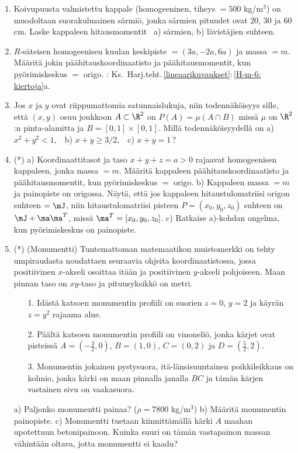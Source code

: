 \begin{enumerate}
\item 
Koivupuusta valmistettu kappale (homogeeninen, tiheys $=500$ kg/m$^3$) on muodoltaan 
suorakulmainen särmiö, jonka särmien pituudet ovat $20$, $30$ ja $60$ cm. Laske kappaleen 
hitausmomentit \ a) särmien, b) lävistäjien suhteen.

\item
$R$-säteisen homogeenisen kuulan keskipiste $=(3a,-2a,6a)$ ja massa $=m$. Määritä jokin
päähitauskoordinaatisto ja päähitausmomentit, kun pyörimiskeskus $=$ origo. : Ks.\
Harj.teht.\,\ref{lineaarikuvaukset}:\,\ref{H-m-6: kiertoja}a.

\item 
Jos $x$ ja $y$ ovat riippumattomia satunnaislukuja, niin todennäköisyys sille, että $(x,y)$ osuu
joukkoon $A\subset\R^2$ on $P(A)=\mu(A \cap B)$ missä $\mu$ on $\R^2$:n pinta-alamitta ja
$B=[0,1]\times[0,1]$. Millä todennäköisyydellä on \newline
a) $x^2+y^2 < 1$, \,\ b) $x+y\ge 3/2$, \,\ c) $x+y=1$\,?

\item (*)
a) Koordinaattitasot ja taso $x+y+z=a>0$ rajaavat homogeenisen kappaleen, jonka massa $=m$.
Määritä kappaleen päähitauskoordinaatisto ja päähitausmomentit, kun pyörimiskeskus
$=$ origo. \vspace{1mm}\newline
b) Kappaleen massa $=m$ ja painopiste on origossa. Näytä, että jos kappaleen hitaustulomatriisi
origon suhteen $=\mJ$, niin hitaustulomatriisi pisteen $P=(x_0,y_0,z_0)$ suhteen on
$\mJ+\ma\ma^T$, missä $\ma^T=[x_0,y_0,z_0]$. \vspace{1mm}\newline
c) Ratkaise a)-kohdan ongelma, kun pyörimiskeskus on painopiste.

\item (*) 
(Monumentti) Tuntemattoman matemaatikon muistomerkki on tehty umpiraudasta
noudattaen seuraavia ohjeita koordinaatistossa, jossa positiivinen $x$-akseli osoittaa itään
ja positiivinen $y$-akseli pohjoiseen. Maan pinnan taso on $xy$-taso ja pituusyksikkö on metri.
\begin{enumerate}
\item[1.] Idästä katsoen monumentin profiili on suorien $z=0,\, y=2$ ja käyrän $z=y^2$ 
          rajaama alue. 
\item[2.] Päältä katsoen monumentin profiili on vinoneliö, jonka kärjet ovat pisteissä 
          $A=(-\frac{3}{2},0)$, $B=(1,0)$, $C=(0,2)$ ja $D=(\frac{5}{2},2)$.
\item[3.] Monumentin jokainen pystysuora, itä-länsisuuntainen poikkileikkaus on kolmio, jonka 
          kärki on maan pinnalla janalla $BC$ ja tämän kärjen vastainen sivu on vaakasuora.
\end{enumerate}
a) Paljonko monumentti painaa? ($\rho=7800$ kg/m$^3$) \newline
b) Määritä monumentin painopiste. \newline
c) Monumentti tuetaan kiinnittämällä kärki $A$ maahan upotettuun betonipainoon. Kuinka suuri
on tämän vastapainon massan vähintään oltava, jotta monumentti ei kaadu?

\end{enumerate}